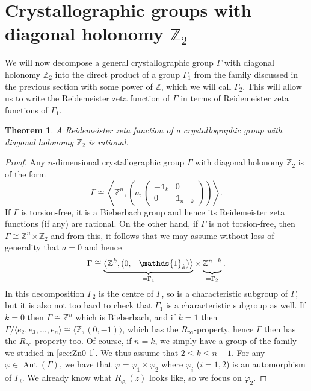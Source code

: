 \documentclass[a4paper]{article}
\theoremstyle{plain}
\newtheorem{theorem}{Theorem}[section]
\theoremstyle{definition}
\theoremstyle{remark}
\DeclareMathOperator{\Aut}{Aut}
\newcommand{\I}{\mathds{1}}
\newcommand{\ZZ}{{\mathbb{Z}}}
\begin{document}
\section{Crystallographic groups with diagonal holonomy \(\ZZ_2\)}
We will now decompose a general crystallographic group \(\Gamma\) with diagonal holonomy \(\ZZ_2\) into the direct product of a group \(\Gamma_1\) from the family discussed in the previous section with some power of \(\ZZ\), which we will call \(\Gamma_2\). This will allow us to write the Reidemeister zeta function of \(\Gamma\) in terms of Reidemeister zeta functions of \(\Gamma_1\).
\begin{theorem}
	A Reidemeister zeta function of a crystallographic group with diagonal holonomy \(\ZZ_2\) is rational.
\end{theorem}
\begin{proof}
Any \(n\)-dimensional crystallographic group \(\Gamma\) with diagonal holonomy  \(\ZZ_2\) is of the form 
\begin{equation*}
\Gamma \cong \left\langle \ZZ^n, \left(a,\begin{pmatrix}
-\I_k & 0\\0 & \I_{n-k}\end{pmatrix}\right)\right\rangle.
\end{equation*}
If \(\Gamma\) is torsion-free, it is a Bieberbach group and hence its Reidemeister zeta functions (if any) are rational. On the other hand, if \(\Gamma\) is not torsion-free, then \(\Gamma\cong \ZZ^n \rtimes \ZZ_2\) and from this, it follows that we may assume without loss of generality that \(a = 0\) and hence
\begin{equation*}
 \Gamma \cong\underbrace{ \left\langle \ZZ^k, \left(0,-\I_k\right)\right\rangle}_{=\Gamma_1} \times \underbrace{\ZZ^{n-k}\vphantom{
 \left\langle \ZZ^k, \left(0,-\I_k\right)\right\rangle}}_{= \Gamma_2}.
\end{equation*}
In this decomposition \(\Gamma_2\) is the centre of \(\Gamma\), so is a characteristic subgroup of \(\Gamma\), but it is also not too hard to check that \(\Gamma_1\) is a characteristic subgroup as well.
If \(k = 0\) then \(\Gamma \cong \ZZ^n\) which is Bieberbach, and if \(k = 1\) then \(\Gamma / \langle e_2, e_3, \dots, e_n \rangle \cong \langle \ZZ, (0,-1)\rangle\), which has the \(R_\infty\)-property, hence \(\Gamma\) then has the \(R_\infty\)-property too. Of course, if \(n = k\), we simply have a group of the family we studied in \cref{sec:Zn0-1}. We thus assume that \(2 \leq k \leq n-1\). For any \(\varphi \in \Aut(\Gamma)\), we have that \(\varphi = \varphi_1 \times \varphi_2\) where \(\varphi_i\) ($i=1,2$) is an automorphism of $\Gamma_i$. We already know what \(R_{\varphi_1}(z)\) looks like, so we focus on \(\varphi_2\).


\end{proof}
\end{document}
